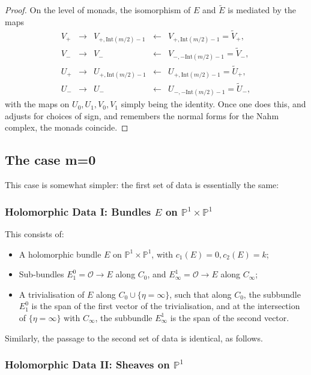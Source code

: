 \documentclass[12pt]{article}
\theoremstyle{definition}
\theoremstyle{remark}
\numberwithin{theorem}{section}
\def\bP{{\mathbb {P}}}
\def\pO{{\mathcal O}}
\begin{document}
\begin{proof}
  On the level of monads, the isomorphism  of $E$ and $\widetilde E$ is mediated by the maps
\begin{equation}\label{ajustment} \begin{matrix} 
  V_+&\rightarrow&  V_{+, \mathrm{Int}(m/2)-1}&\leftarrow& V_{+, \mathrm{Int}(m/2)-1}= \widetilde V_+,\\
  V_-&\rightarrow& V_-&\leftarrow& V_{-, -\mathrm{Int}(m/2)-1}= \widetilde V_-,\\
  U_+&\rightarrow& U_{+, \mathrm{Int}(m/2)-1}&\leftarrow& U_{+, \mathrm{Int}(m/2)-1}= \widetilde U_+,\\
  U_-&\rightarrow& U_-&\leftarrow& U_{-, -\mathrm{Int}(m/2)-1}= \widetilde U_-,
  \end{matrix}\end{equation}
 with the maps on $U_0, U_1, V_0, V_1$ simply being the identity. Once one does this, and adjusts for choices of sign, and remembers the normal forms for the Nahm complex, the monads coincide. \end{proof}
 
 \subsection{The case m=0}
 
 This case is somewhat simpler: the first set of data is essentially the same:
 \subsubsection{Holomorphic Data I: Bundles $E$ on $\bP^1\times \bP^1$} 
 This consists of:

\begin{itemize} 
\item A holomorphic bundle $E$ on $\bP^1\times \bP^1$, with $c_1(E) = 0, c_2(E) = k$; 
\item Sub-bundles $E^0_1 = \pO\rightarrow E$ along $C_0$, and $E_\infty^1= \pO  \rightarrow E$ along $C_\infty$;  
\item A trivialisation of $E$ along $C_0\cup  \{\eta = \infty\}$, such that along $C_0$, the subbundle $E^0_1$ is the span of the first vector of the trivialisation, and at the intersection of $\{\eta = \infty\}$ with $C_\infty$, the subbundle $E_\infty^1$ is the span of the second vector.
\end{itemize}

Similarly, the passage to the second set of data is identical, as follows.  
\subsubsection{Holomorphic Data II: Sheaves   on $\bP^1$}
\end{document}

